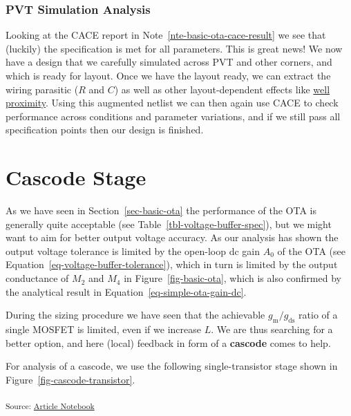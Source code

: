 \documentclass[
  a4paper,
  DIV=11,
  numbers=noendperiod]{scrartcl}
\begin{document}
\subsubsection{PVT Simulation Analysis}\label{pvt-simulation-analysis}

Looking at the CACE report in Note~\ref{nte-basic-ota-cace-result} we
see that (luckily) the specification is met for all parameters. This is
great news! We now have a design that we carefully simulated across PVT
and other corners, and which is ready for layout. Once we have the
layout ready, we can extract the wiring parasitic (\(R\) and \(C\)) as
well as other layout-dependent effects like
\href{https://global.oup.com/us/companion.websites/9780195170153/pdf/proximityeffectmodels.pdf}{well
proximity}. Using this augmented netlist we can then again use CACE to
check performance across conditions and parameter variations, and if we
still pass all specification points then our design is finished.

\section{Cascode Stage}\label{sec-cascode-stage}

As we have seen in Section~\ref{sec-basic-ota} the performance of the
OTA is generally quite acceptable (see
Table~\ref{tbl-voltage-buffer-spec}), but we might want to aim for
better output voltage accuracy. As our analysis has shown the output
voltage tolerance is limited by the open-loop dc gain \(A_0\) of the OTA
(see Equation~\ref{eq-voltage-buffer-tolerance}), which in turn is
limited by the output conductance of \(M_2\) and \(M_4\) in
Figure~\ref{fig-basic-ota}, which is also confirmed by the analytical
result in Equation~\ref{eq-simple-ota-gain-dc}.

During the sizing procedure we have seen that the achievable
\(g_\mathrm{m}/ g_\mathrm{ds}\) ratio of a single MOSFET is limited,
even if we increase \(L\). We are thus searching for a better option,
and here (local) feedback in form of a \textbf{cascode} comes to help.

For analysis of a cascode, we use the following single-transistor stage
shown in Figure~\ref{fig-cascode-transistor}.

\textsubscript{Source:
\href{https://iic-jku.github.io/analog-circuit-design/index.qmd.html}{Article
Notebook}}
\end{document}
